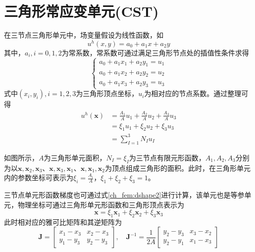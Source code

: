 \section{三角形常应变单元(CST)}
在三节点三角形单元中，场变量假设为线性函数，如
\begin{equation}
u^h(x,y) = a_0 + a_1 x + a_2 y
\end{equation}
其中，$a_i,i=0,1,2$为常系数，常系数可通过满足三角形节点处的插值性条件求得
\begin{equation}
\begin{cases}
a_0 + a_1 x_1 + a_2 y_1 = u_1 \\
a_0 + a_1 x_2 + a_2 y_2 = u_2 \\
a_0 + a_1 x_3 + a_2 y_3 = u_3
\end{cases}
\end{equation}
式中$(x_i,y_i),i=1,2,3$为三角形顶点坐标，$u_i$为相对应的节点系数。通过整理可得
\begin{equation}
\begin{split}
u^h(\boldsymbol x) &= \frac{A_1}{A} u_1 + \frac{A_2}{A} u_2 + \frac{A_3}{A} u_3 \\
&= \xi_1 u_1 + \xi_2 u_2 + \xi_3 u_3 \\
&= \sum_{I=1}^{3}N_I u_I
\end{split}
\end{equation}\par
如图所示，$A$为三角形单元面积，$N_I=\xi_I$为三节点有限元形函数，$A_1,A_2,A_3$分别为以$\boldsymbol x,\boldsymbol x_2,\boldsymbol x_3$、$\boldsymbol x,\boldsymbol x_3,\boldsymbol x_1$、$\boldsymbol x,\boldsymbol x_1,\boldsymbol x_2$为顶点组成三角形的面积。此时，在三角形单元内的参数坐标可表示为$\xi_i=\frac{A_i}{A}$，$\xi_1+\xi_2+\xi_3=1$。\par
三节点单元形函数梯度也可通过式\eqref{ch_fem:dshape2}进行计算，该单元也是等参单元，物理坐标可通过三角形单元形函数和三角形顶点表示为
\begin{equation}
\boldsymbol x = \xi_1 \boldsymbol x_1 + \xi_2 \boldsymbol x_2 + \xi_3 \boldsymbol x_3
\end{equation}
此时相对应的雅可比矩阵和其逆矩阵为
\begin{equation}
\boldsymbol J = 
\begin{bmatrix}
x_1-x_3 & x_2-x_3 \\
y_1-y_3 & y_2-y_3
\end{bmatrix},\quad
\boldsymbol J^{-1} = \frac{1}{2A}
\begin{bmatrix}
y_2-y_3 & x_3-x_2 \\
y_2-y_1 & x_1-x_3
\end{bmatrix}
\end{equation}
